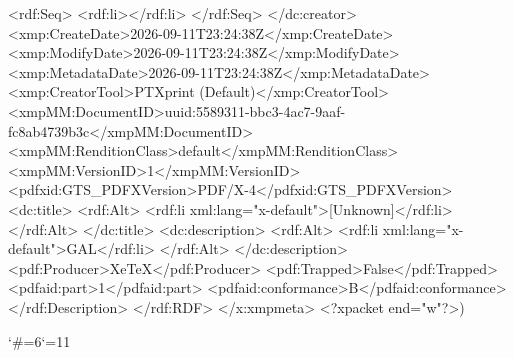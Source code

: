 {          <rdf:Seq>
            <rdf:li></rdf:li>
          </rdf:Seq>
        </dc:creator>
        <xmp:CreateDate>2026-09-11T23:24:38Z</xmp:CreateDate>
        <xmp:ModifyDate>2026-09-11T23:24:38Z</xmp:ModifyDate>
        <xmp:MetadataDate>2026-09-11T23:24:38Z</xmp:MetadataDate>
        <xmp:CreatorTool>PTXprint (Default)</xmp:CreatorTool>
        <xmpMM:DocumentID>uuid:5589311-bbc3-4ac7-9aaf-fc8ab4739b3c</xmpMM:DocumentID>
        <xmpMM:RenditionClass>default</xmpMM:RenditionClass>
        <xmpMM:VersionID>1</xmpMM:VersionID>
        <pdfxid:GTS_PDFXVersion>PDF/X-4</pdfxid:GTS_PDFXVersion>
        <dc:title>
          <rdf:Alt>
            <rdf:li xml:lang="x-default">[Unknown]</rdf:li>
          </rdf:Alt>
        </dc:title>
        <dc:description>
          <rdf:Alt>
            <rdf:li xml:lang="x-default">GAL</rdf:li>
          </rdf:Alt>
        </dc:description>
        <pdf:Producer>XeTeX</pdf:Producer>
        <pdf:Trapped>False</pdf:Trapped>
      <pdfaid:part>1</pdfaid:part>
      <pdfaid:conformance>B</pdfaid:conformance>
      </rdf:Description>
  </rdf:RDF>
</x:xmpmeta>
<?xpacket end="w"?>)}
\egroup
\catcode`\#=6\catcode`\@=11 \activ@tecustomch@rs








